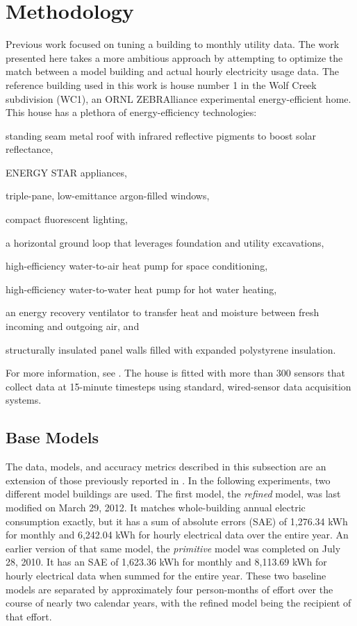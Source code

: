 \documentclass[preprint, review, 12pt]{elsarticle}
\begin{document}
\section{Methodology}
\label{sec:methodology}
Previous work \cite{cit:garrett2013} focused on tuning a building to monthly utility data. The work presented here takes a more ambitious approach by attempting to optimize the match between a model building and actual hourly electricity usage data. The reference building used in this work is house number 1 in the Wolf Creek subdivision (WC1), an ORNL ZEBRAlliance experimental energy-efficient home. This house has a plethora of energy-efficiency technologies: 
\begin{inparaenum}[(1)]
\item standing seam metal roof with infrared reflective pigments to boost solar reflectance,
\item ENERGY STAR appliances, 
\item triple-pane, low-emittance argon-filled windows, 
\item compact fluorescent lighting, 
\item a horizontal ground loop that leverages foundation and utility excavations, 
\item high-efficiency water-to-air heat pump for space conditioning, 
\item high-efficiency water-to-water heat pump for hot water heating, 
\item an energy recovery ventilator to transfer heat and moisture between fresh incoming and outgoing air, and 
\item structurally insulated panel walls filled with expanded polystyrene insulation.
\end{inparaenum}
For more information, see \cite{cit:miller2012,cit:biswas2012}. The house is fitted with more than 300 sensors that collect data at 15-minute timesteps using standard, wired-sensor data acquisition systems.

\subsection{Base Models}
The data, models, and accuracy metrics described in this subsection are an extension of those previously reported in \cite{cit:garrett2013}. In the following experiments, two different model buildings are used. The first model, the \emph{refined} model, was last modified on March 29, 2012. It matches whole-building annual electric consumption exactly, but it has a sum of absolute errors (SAE) of 1,276.34 kWh for monthly and 6,242.04 kWh for hourly electrical data over the entire year. An earlier version of that same model, the \emph{primitive} model was completed on July 28, 2010. It has an SAE of 1,623.36 kWh for monthly and 8,113.69 kWh for hourly electrical data when summed for the entire year. These two baseline models are separated by approximately four person-months of effort over the course of nearly two calendar years, with the refined model being the recipient of that effort.
\end{document}
